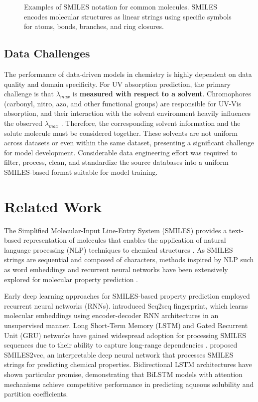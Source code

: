\documentclass[11pt,a4paper]{article}
\begin{document}
\begin{figure}[H]
\begin{tikzpicture}[scale=0.85, transform shape]
  \end{tikzpicture}
  \caption{Examples of SMILES notation for common molecules. SMILES encodes molecular structures as linear strings using specific symbols for atoms, bonds, branches, and ring closures.}
  \label{fig:smiles_examples}
\end{figure}

\subsection{Data Challenges}

The performance of data-driven models in chemistry is highly dependent on data quality and domain specificity. For UV absorption prediction, the primary challenge is that $\lambda_{max}$ is \textbf{measured with respect to a solvent}. Chromophores (carbonyl, nitro, azo, and other functional groups) are responsible for UV-Vis absorption, and their interaction with the solvent environment heavily influences the observed $\lambda_{max}$ \cite{koplikUltravioletVisibleSpectrometry, clarkWhatCausesMolecules2013}. Therefore, the corresponding solvent information and the solute molecule must be considered together. These solvents are not uniform across datasets or even within the same dataset, presenting a significant challenge for model development. Considerable data engineering effort was required to filter, process, clean, and standardize the source databases into a uniform SMILES-based format suitable for model training.

\section{Related Work}


The Simplified Molecular-Input Line-Entry System (SMILES) provides a text-based representation of molecules that enables the application of natural language processing (NLP) techniques to chemical structures \citep{weiningerSMILESChemicalLanguage1988}. As SMILES strings are sequential and composed of characters, methods inspired by NLP such as word embeddings and recurrent neural networks have been extensively explored for molecular property prediction \citep{gohSMILES2VecInterpretableGeneralPurpose2018}.

Early deep learning approaches for SMILES-based property prediction employed recurrent neural networks (RNNs). \citet{xuSeq2seqFingerprintUnsupervised2017} introduced Seq2seq fingerprint, which learns molecular embeddings using encoder-decoder RNN architectures in an unsupervised manner. Long Short-Term Memory (LSTM) and Gated Recurrent Unit (GRU) networks have gained widespread adoption for processing SMILES sequences due to their ability to capture long-range dependencies \citep{GeneratingFocusedMolecule}. \citet{gohSMILES2VecInterpretableGeneralPurpose2018} proposed SMILES2vec, an interpretable deep neural network that processes SMILES strings for predicting chemical properties. Bidirectional LSTM architectures have shown particular promise, demonstrating that BiLSTM models with attention mechanisms achieve competitive performance in predicting aqueous solubility and partition coefficients.
\end{document}
